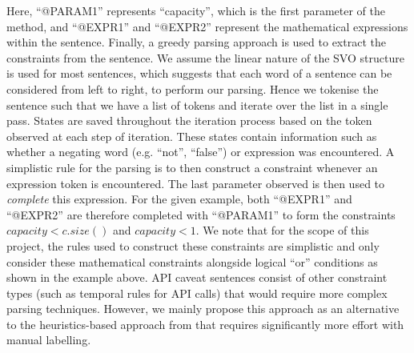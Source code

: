 Here, ``@PARAM1'' represents ``capacity'', which is the first parameter of the method, and ``@EXPR1'' and ``@EXPR2'' represent the mathematical expressions within the sentence. Finally, a greedy parsing approach is used to extract the constraints from the sentence. We assume the linear nature of the SVO structure is used for most sentences, which suggests that each word of a sentence can be considered from left to right, to perform our parsing. Hence we tokenise the sentence such that we have a list of tokens and iterate over the list in a single pass. States are saved throughout the iteration process based on the token observed at each step of iteration. These states contain information such as whether a negating word (e.g. ``not'', ``false'') or expression was encountered. A simplistic rule for the parsing is to then construct a constraint whenever an expression token is encountered. The last parameter observed is then used to \textit{complete} this expression. For the given example, both ``@EXPR1'' and ``@EXPR2'' are therefore completed with ``@PARAM1'' to form the constraints $capacity<c.size()$ and $capacity<1$. We note that for the scope of this project, the rules used to construct these constraints are simplistic and only consider these mathematical constraints alongside logical ``or'' conditions as shown in the example above. API caveat sentences consist of other constraint types (such as temporal rules for API calls) that would require more complex parsing techniques. However, we mainly propose this approach as an alternative to the heuristics-based approach from \citeauthor{zhou-directive} that requires significantly more effort with manual labelling.\\

